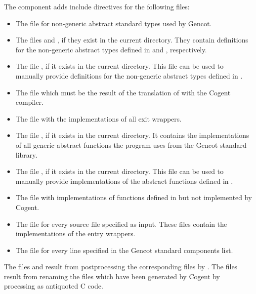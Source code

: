 The component adds include directives for the following files:
\begin{itemize}
\item The file  for non-generic abstract standard types used by Gencot.
\item The files  and , if they exist in the current directory. 
They contain definitions for the non-generic abstract types defined in  and 
, respectively.
\item The file , if it exists in the current directory. This file can be used to
manually provide definitions for the non-generic abstract types defined in .
\item The file  which must be the result of the translation of 
with the Cogent compiler.
\item The file  with the implementations of all exit wrappers.
\item The file , if it exists in the current directory. It contains the 
implementations of all generic abstract functions the program uses from the Gencot standard library.
\item The file , if it exists in the current directory. This file can be used to
manually provide implementations of the abstract functions defined in .
\item The file  with implementations of functions defined in 
but not implemented by Cogent.
\item The file  for every source file  specified as input. These files contain
the implementations of the entry wrappers.
\item The file  for every line  specified in the Gencot standard
components list.
\end{itemize}

The files  and  result from postprocessing the corresponding 
 files by . The files  result from renaming the files
 which have been generated by Cogent by processing  as antiquoted C code.
